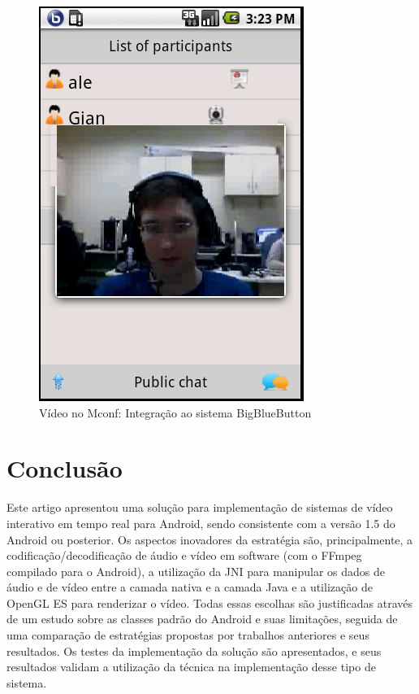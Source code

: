\documentclass{acm_proc_article-sp}
\begin{document}
\begin{figure}[htp]
 \centering
 \includegraphics[scale=0.38]{./mconf.jpg}
\caption{Vídeo no Mconf: Integração ao sistema BigBlueButton}\label{figura_mconf}
\end{figure}

\section{Conclusão}

Este artigo apresentou uma solução para implementação de sistemas de vídeo interativo em tempo real para Android, sendo consistente com a versão 1.5 do Android ou posterior. Os aspectos inovadores da estratégia são, principalmente, a codificação/decodificação de áudio e vídeo em software (com o FFmpeg compilado para o Android), a utilização da JNI para manipular os dados de áudio e de vídeo entre a camada nativa e a camada Java e a utilização de OpenGL ES para renderizar o vídeo. Todas essas escolhas são justificadas através de um estudo sobre as classes padrão do Android e suas limitações, seguida de uma comparação de estratégias propostas por trabalhos anteriores e seus resultados. Os testes da implementação da solução são apresentados, e seus resultados validam a utilização da técnica na implementação desse tipo de sistema.
\end{document}
